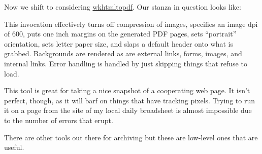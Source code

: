 Now we shift to considering
\href{https://wkhtmltopdf.org/}{wkhtmltopdf}. Our stanza in question
looks like:

\begin{Shaded}
\begin{Highlighting}[]
 \NormalTok{ 2.54cm }\NormalTok{ 2.54cm }\NormalTok{ 2.54cm }\NormalTok{ 2.54cm }        
\end{Highlighting}
\end{Shaded}

This invocation effectively turns off compression of images, specifies
an image dpi of 600, puts one inch margins on the generated PDF pages,
sets ``portrait'' orientation, sets letter paper size, and slaps a
default header onto what is grabbed. Backgrounds are rendered as are
external links, forms, images, and internal links. Error handling is
handled by just skipping things that refuse to load.

This tool is great for taking a nice snapshot of a cooperating web page.
It isn't perfect, though, as it will barf on things that have tracking
pixels. Trying to run it on a page from the site of my local daily
broadsheet is almost impossible due to the number of errors that erupt.

There are other tools out there for archiving but these are low-level
ones that are useful.

